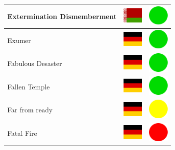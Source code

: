 \documentclass[12pt, a4paper, twoside]{report}
\begin{document}
\begin{center}
\begin{longtable}{|p{5cm}|p{2cm}|p{2cm}|}
Extermination Dismemberment & \includegraphics[width=1cm]{4x3/by} & \includegraphics[width=1cm]{likes/y} \\ \hline
Exumer & \includegraphics[width=1cm]{4x3/de} & \includegraphics[width=1cm]{likes/y} \\ \hline
Fabulous Desaster & \includegraphics[width=1cm]{4x3/de} & \includegraphics[width=1cm]{likes/y} \\ \hline
Fallen Temple & \includegraphics[width=1cm]{4x3/de} & \includegraphics[width=1cm]{likes/y} \\ \hline
Far from ready & \includegraphics[width=1cm]{4x3/de} & \includegraphics[width=1cm]{likes/m} \\ \hline
Fatal Fire & \includegraphics[width=1cm]{4x3/de} & \includegraphics[width=1cm]{likes/n} \\ \hline

\end{longtable}
\end{center}
\end{document}
